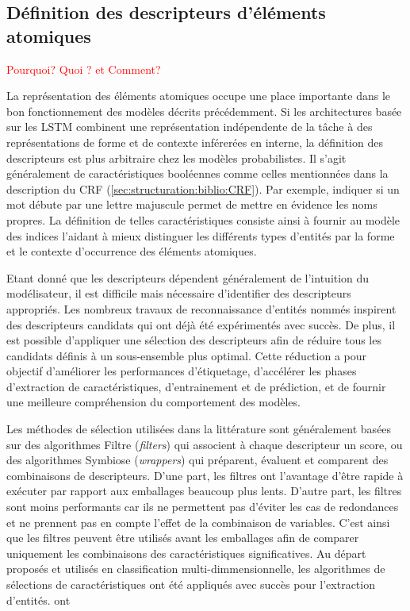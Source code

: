 \subsection{Définition des descripteurs d'éléments atomiques}
\textcolor{red}{Pourquoi? Quoi ? et Comment?}

La représentation des éléments atomiques occupe une place importante dans le bon fonctionnement des modèles décrits précédemment. Si les architectures basée sur les LSTM combinent une représentation indépendente de la tâche à des représentations de forme et de contexte inférerées en interne, la définition des descripteurs est plus arbitraire chez les modèles probabilistes. Il s'agit généralement de caractéristiques booléennes comme celles mentionnées dans la description du CRF (\ref{sec:structuration:biblio:CRF}). Par exemple, indiquer si un mot débute par une lettre majuscule permet de mettre en évidence les noms propres. La définition de telles caractéristiques consiste ainsi à fournir au modèle des indices l'aidant à mieux distinguer les différents types d'entités par la forme et le contexte d'occurrence des éléments atomiques. 

Etant donné que les descripteurs dépendent généralement de l'intuition du modélisateur, il est difficile mais nécessaire d'identifier des descripteurs appropriés. Les nombreux travaux de reconnaissance d'entités nommés inspirent des descripteurs candidats qui ont déjà été expérimentés avec succès. De plus, il est possible d'appliquer une sélection des descripteurs afin de réduire tous les candidats définis à un sous-ensemble plus optimal. Cette réduction a pour objectif d'améliorer les performances d'étiquetage, d'accélérer les phases d'extraction de caractéristiques, d'entrainement et de prédiction, et de fournir une meilleure compréhension du comportement des modèles. 

Les méthodes de sélection utilisées dans la littérature sont généralement basées sur des algorithmes Filtre (\textit{filters}) qui associent à chaque descripteur un score, ou des algorithmes Symbiose (\textit{wrappers}) qui préparent, évaluent et comparent des combinaisons de descripteurs. D'une part, les filtres ont l'avantage d'être rapide à exécuter par rapport aux emballages beaucoup plus lents. D'autre part, les filtres sont moins performants car ils ne permettent pas d'éviter les cas de redondances et ne prennent pas en compte l'effet de la combinaison de variables. C'est ainsi que les filtres peuvent être utilisés avant les emballages afin de comparer uniquement les combinaisons des caractéristiques significatives. Au départ proposés et utilisés en classification multi-dimmensionnelle, les algorithmes de sélections de caractéristiques ont été appliqués avec succès pour l'extraction d'entités. \citet{klinger2009FeaturefilterCRF} ont 

